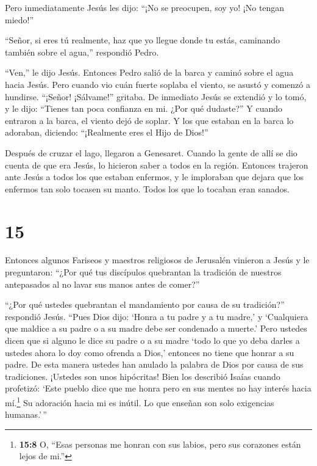  Pero inmediatamente Jesús les dijo: ``¡No se preocupen,
soy yo! ¡No tengan miedo!''

 ``Señor, si eres tú realmente, haz que yo llegue donde tu
estás, caminando también sobre el agua,'' respondió Pedro.

 ``Ven,'' le dijo Jesús. Entonces Pedro salió de la barca y
caminó sobre el agua hacia Jesús.  Pero cuando vio cuán
fuerte soplaba el viento, se asustó y comenzó a hundirse. ``¡Señor!
¡Sálvame!'' gritaba.  De inmediato Jesús se extendió y lo
tomó, y le dijo: ``Tienes tan poca confianza en mi. ¿Por qué dudaste?''
 Y cuando entraron a la barca, el viento dejó de soplar.
 Y los que estaban en la barca lo adoraban, diciendo:
``¡Realmente eres el Hijo de Dios!''

 Después de cruzar el lago, llegaron a Genesaret.
 Cuando la gente de allí se dio cuenta de que era Jesús, lo
hicieron saber a todos en la región. Entonces trajeron ante Jesús a
todos los que estaban enfermos,  y le imploraban que dejara
que los enfermos tan solo tocasen su manto. Todos los que lo tocaban
eran sanados.

\hypertarget{section-14}{%
\section{15}\label{section-14}}

 Entonces algunos Fariseos y maestros religiosos de
Jerusalén vinieron a Jesús y le preguntaron:  ``¿Por qué tus
discípulos quebrantan la tradición de nuestros antepasados al no lavar
sus manos antes de comer?''

 ``¿Por qué ustedes quebrantan el mandamiento por causa de
su tradición?'' respondió Jesús.  ``Pues Dios dijo: `Honra a
tu padre y a tu madre,' y `Cualquiera que maldice a su padre o a su
madre debe ser condenado a muerte.'  Pero ustedes dicen que
si alguno le dice su padre o a su madre `todo lo que yo deba darles a
ustedes ahora lo doy como ofrenda a Dios,' entonces  no
tiene que honrar a su padre. De esta manera ustedes han anulado la
palabra de Dios por causa de sus tradiciones.  ¡Ustedes son
unos hipócritas! Bien los describió Isaías cuando profetizó:
 `Este pueblo dice que me honra pero en sus mentes no hay
interés hacia mí.\footnote{\textbf{15:8} O, ``Esas personas me honran
  con sus labios, pero sus corazones están lejos de mi.''} 
Su adoración hacia mi es inútil. Lo que enseñan son solo exigencias
humanas.'\,''

